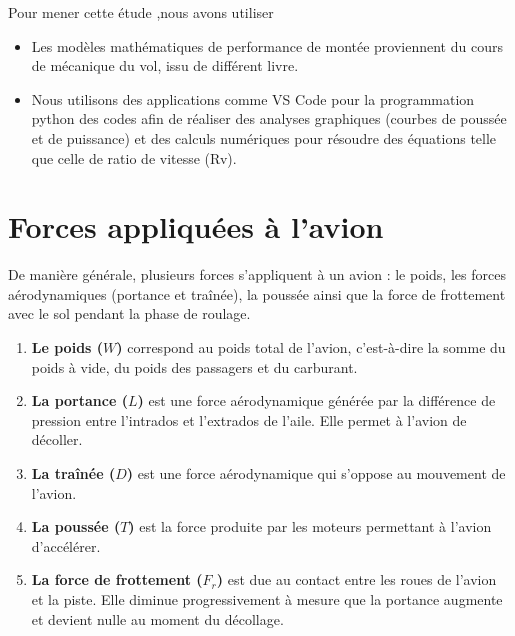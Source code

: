 		Pour mener cette étude ,nous avons utiliser 
		\begin{itemize}
			\item  Les modèles mathématiques de performance de montée proviennent du cours de mécanique du vol, issu de différent livre.
			\item Nous utilisons des applications comme VS Code pour la programmation python des codes afin de réaliser des analyses graphiques (courbes de poussée et de puissance) et des calculs numériques pour résoudre des équations  telle que celle de ratio de vitesse (Rv).
		\end{itemize}

	
\section{Forces appliquées à l’avion}\label{sec:section1}
	
	De manière générale, plusieurs forces s’appliquent à un avion : le poids, les forces aérodynamiques (portance et traînée), la poussée ainsi que la force de frottement avec le sol pendant la phase de roulage.
	
	\begin{enumerate}
		
		\item \textbf{Le poids ($W$)} correspond au poids total de l’avion, c’est-à-dire la somme du poids à vide, du poids des passagers et du carburant.
		
		\item \textbf{La portance ($L$)} est une force aérodynamique générée par la différence de pression entre l’intrados et l’extrados de l’aile. Elle permet à l’avion de décoller.
		
		\item \textbf{La traînée ($D$)} est une force aérodynamique qui s’oppose au mouvement de l’avion.
		
		\item \textbf{La poussée ($T$)} est la force produite par les moteurs permettant à l’avion d’accélérer.
		
		\item \textbf{La force de frottement ($F_r$)} est due au contact entre les roues de l’avion et la piste. Elle diminue progressivement à mesure que la portance augmente et devient nulle au moment du décollage.
		
	\end{enumerate}
	
